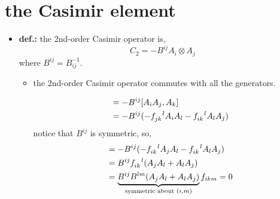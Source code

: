 \section{the Casimir element}
\begin{itemize}
	\item \textbf{\textbf{def.:}} the 2nd-order Casimir operator is,
	\begin{equation}
		C_2 = - B^{i j} A_i \otimes A_j
	\end{equation}
	where $B^{i j} = B^{- 1}_{i j}$.
	\begin{itemize}
		\item the 2nd-order Casimir operator commutes with all the generators.
		
		\begin{tcolorbox}[title=proof:]
			\begin{align}
				[C_2, A_k] &= - B^{i j} [A_i A_j, A_k] \notag \\
				&= - B^{i j} (- \tensor{f}{_{j k}^l} A_i A_l - \tensor{f}{_{i k}^l} A_l A_j)
			\end{align}
			notice that $B^{i j}$ is symmetric, so,
			\begin{align}
				[C_2, A_k] &= - B^{i j} (- \tensor{f}{_{i k}^l} A_j A_l - \tensor{f}{_{i k}^l} A_l A_j) \notag \\
				&= B^{i j} \tensor{f}{_{i k}^l} (A_j A_l + A_l A_j) \notag \\
				&= \underbrace{B^{i j} B^{l m} (A_j A_l + A_l A_j)}_{\text{symmetric about } (i, m)} f_{i k m} = 0
			\end{align}
		\end{tcolorbox}
	\end{itemize}
\end{itemize}

